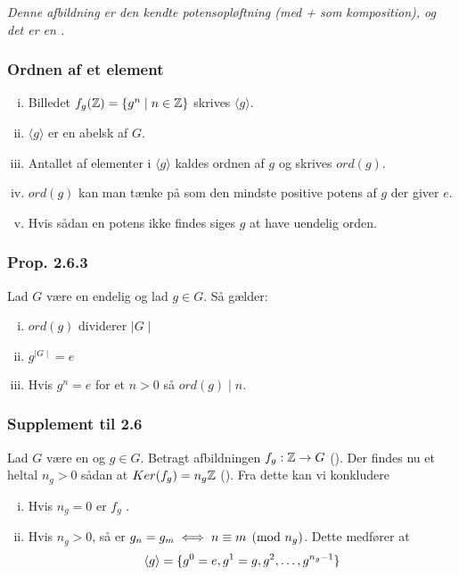 \textit{Denne afbildning er den kendte potensopløftning (med + som komposition),
og det er en .}

\subsubsection{Ordnen af et element}
\label{ord(g)}
\begin{enumerate}[(i)]
  \item Billedet $f_g(\mathbb{Z}) = \{g^n \mid n \in \mathbb{Z}\}$ skrives $\langle g \rangle$.
  \item $\langle g \rangle$ er en abelsk  af $G$.
  \item Antallet af elementer i $\langle g \rangle$ kaldes ordnen af $g$ og
  skrives $ord(g)$.
  \item $ord(g)$ kan man tænke på som den mindste positive potens af $g$ der
  giver $e$.
  \item Hvis sådan en potens ikke findes siges $g$ at have uendelig orden.
\end{enumerate}

\subsubsection{Prop. 2.6.3}
Lad $G$ være en endelig  og lad $g \in G$. Så gælder:
\begin{enumerate}[(i)]
  \item $ord(g)$ dividerer $\mid G\mid$
  \item $g^{\mid G\mid} = e$
  \item Hvis $g^n = e$ for et $n > 0$ så $ord(g)\mid n$.
\end{enumerate}

\subsubsection{Supplement til 2.6}
Lad $G$ være en  og $g \in G$. Betragt afbildningen $f_g: \mathbb{Z}
\rightarrow G$ (). Der findes nu et heltal $n_g > 0$ sådan at
$Ker(f_g) = n_g\mathbb{Z}$ (). Fra dette kan vi konkludere
\begin{enumerate}[(i)]
  \item Hvis $n_g = 0$ er $f_g$ .
  \item Hvis $n_g > 0$, så er $g_n = g_m \iff n \equiv m \pmod{n_g}$. Dette medfører
  at
  \begin{equation*}
  \langle g \rangle = \{ g^0 = e, g^1 = g, g^2, \ldots, g^{n_g -1} \}
  \end{equation*}
\end{enumerate}

